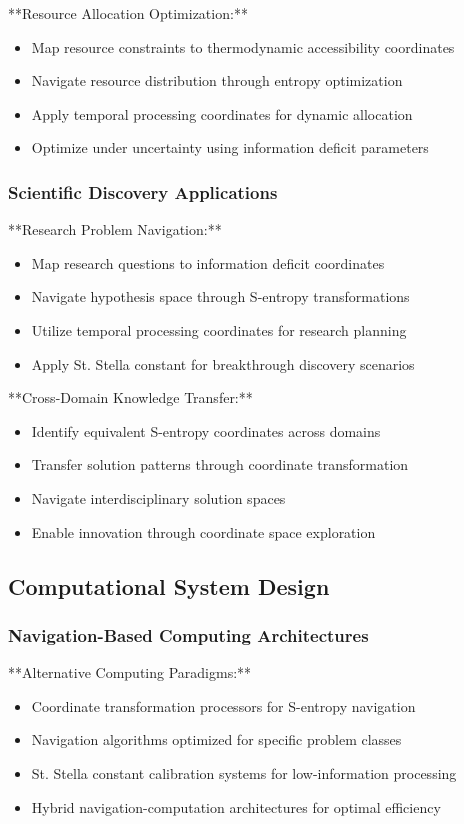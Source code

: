 \documentclass[12pt,a4paper]{article}
\begin{document}
**Resource Allocation Optimization:**
\begin{itemize}
\item Map resource constraints to thermodynamic accessibility coordinates
\item Navigate resource distribution through entropy optimization
\item Apply temporal processing coordinates for dynamic allocation
\item Optimize under uncertainty using information deficit parameters
\end{itemize}

\subsubsection{Scientific Discovery Applications}

**Research Problem Navigation:**
\begin{itemize}
\item Map research questions to information deficit coordinates
\item Navigate hypothesis space through S-entropy transformations
\item Utilize temporal processing coordinates for research planning
\item Apply St. Stella constant for breakthrough discovery scenarios
\end{itemize}

**Cross-Domain Knowledge Transfer:**
\begin{itemize}
\item Identify equivalent S-entropy coordinates across domains
\item Transfer solution patterns through coordinate transformation
\item Navigate interdisciplinary solution spaces
\item Enable innovation through coordinate space exploration
\end{itemize}

\subsection{Computational System Design}

\subsubsection{Navigation-Based Computing Architectures}

**Alternative Computing Paradigms:**
\begin{itemize}
\item Coordinate transformation processors for S-entropy navigation
\item Navigation algorithms optimized for specific problem classes
\item St. Stella constant calibration systems for low-information processing
\item Hybrid navigation-computation architectures for optimal efficiency
\end{itemize}
\end{document}
